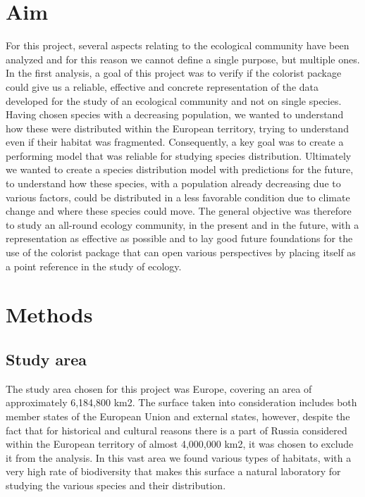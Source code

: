 \documentclass[12pt,a4paper]{article}
\begin{document}
\section{Aim}
For this project, several aspects relating to the ecological community have been analyzed and for this reason we cannot define a single purpose, but multiple ones.
In the first analysis, a goal of this project was to verify if the colorist package could give us a reliable, effective and concrete representation of the data developed for the study of an ecological community and not on single species.
Having chosen species with a decreasing population, we wanted to understand how these were distributed within the European territory, trying to understand even if their habitat was fragmented.
Consequently, a key goal was to create a performing model that was reliable for studying species distribution.
Ultimately we wanted to create a species distribution model with predictions for the future, to understand how these species, with a population already decreasing due to various factors, could be distributed in a less favorable condition due to climate change and where these species could move.
The general objective was therefore to study an all-round ecology community, in the present and in the future, with a representation as effective as possible and to lay good future foundations for the use of the colorist package that can open various perspectives by placing itself as a point reference in the study of ecology.

\section{Methods}
\subsection{Study area}
The study area chosen for this project was Europe, covering an area of approximately 6,184,800 km2.
The surface taken into consideration includes both member states of the European Union and external states, however, despite the fact that for historical and cultural reasons there is a part of Russia considered within the European territory of almost 4,000,000 km2, it was chosen to exclude it from the analysis.
In this vast area we found various types of habitats, with a very high rate of biodiversity that makes this surface a natural laboratory for studying the various species and their distribution.
\end{document}
